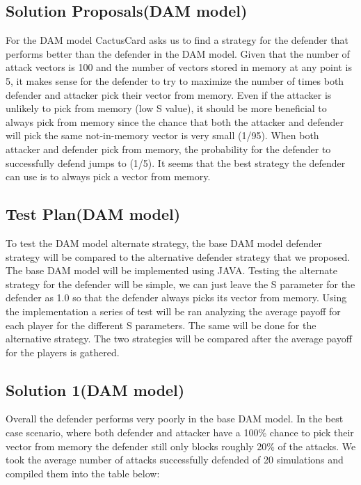 \documentclass[11pt,journal]{IEEEtran}
\begin{document}
\subsection{Solution Proposals(DAM model)}
For the DAM model CactusCard asks us to find a strategy for the defender that performs better than the defender in the DAM model. Given that the number of attack vectors is 100 and the number of vectors stored in memory at any point is 5, it makes sense for the defender to try to maximize the number of times both defender and attacker pick their vector from memory. Even if the attacker is unlikely to pick from memory (low S value), it should be more beneficial to always pick from memory since the chance that both the attacker and defender will pick the same not-in-memory vector is very small (1/95). When both attacker and defender pick from memory, the probability for the defender to successfully defend jumps to (1/5). It seems that the best strategy the defender can use is to always pick a vector from memory. 

\subsection{Test Plan(DAM model)}
To test the DAM model alternate strategy, the base DAM model defender strategy will be compared to the alternative defender strategy that we proposed. The base DAM model will be implemented using JAVA. Testing the alternate strategy for the defender will be simple, we can just leave the S parameter for the defender as 1.0 so that the defender always picks its vector from memory. Using the implementation a series of test will be ran analyzing the average payoff for each player for the different S parameters. The same will be done for the alternative strategy. The two strategies will be compared after the average payoff for the players is gathered.

\subsection{Solution 1(DAM model)}
Overall the defender performs very poorly in the base DAM model. In the best case scenario, where both defender and attacker have a 100\% chance to pick their vector from memory the defender still only blocks roughly 20\% of the attacks. We took the average number of attacks successfully defended of 20 simulations and compiled them into the table below:
\end{document}
